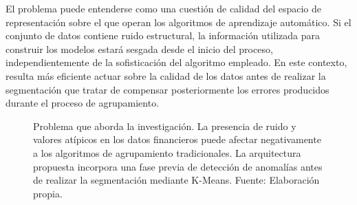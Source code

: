 \documentclass[
]{article}
\begin{document}
	El problema puede entenderse como una cuestión de calidad del espacio de representación sobre el que operan los algoritmos de aprendizaje automático. Si el conjunto de datos contiene ruido estructural, la información utilizada para construir los modelos estará sesgada desde el inicio del proceso, independientemente de la sofisticación del algoritmo empleado. En este contexto, resulta más eficiente actuar sobre la calidad de los datos antes de realizar la segmentación que tratar de compensar posteriormente los errores producidos durante el proceso de agrupamiento.
	
	\begin{figure}[H]
		\centering
		
		\caption{Problema que aborda la investigación. La presencia de ruido y valores atípicos en los datos financieros puede afectar negativamente a los algoritmos de agrupamiento tradicionales. La arquitectura propuesta incorpora una fase previa de detección de anomalías antes de realizar la segmentación mediante K-Means. Fuente: Elaboración propia.}
		
		\label{fig:problema}
	\end{figure}
	
\end{document}

